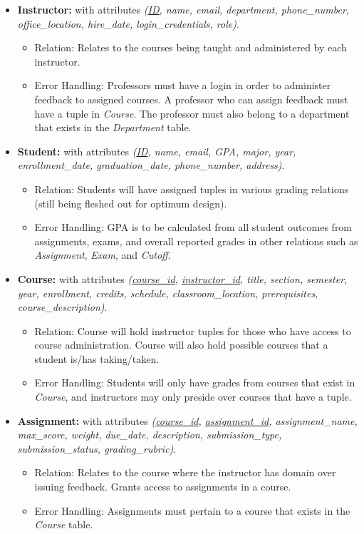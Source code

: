 \documentclass[12pt]{article}
\begin{document}
\begin{itemize}
    \item \textbf{Instructor:} with attributes \textit{(\underline{ID}, name, email, department, phone\_number, office\_location, hire\_date, login\_credentials, role)}.
    \begin{itemize}
        \item Relation: Relates to the courses being taught and administered by each instructor.
        \item Error Handling: Professors must have a login in order to administer feedback to assigned courses. A professor who can assign feedback must have a tuple in \textit{Course}. The professor must also belong to a department that exists in the \textit{Department} table.
    \end{itemize}

    \item \textbf{Student:} with attributes \textit{(\underline{ID}, name, email, GPA, major, year, enrollment\_date, graduation\_date, phone\_number, address)}.
    \begin{itemize}
        \item Relation: Students will have assigned tuples in various grading relations (still being fleshed out for optimum design).
        \item Error Handling: GPA is to be calculated from all student outcomes from assignments, exams, and overall reported grades in other relations such as \textit{Assignment}, \textit{Exam}, and \textit{Cutoff}.
    \end{itemize}

    \item \textbf{Course:} with attributes \textit{(\underline{course\_id}, \underline{instructor\_id}, title, section, semester, year, enrollment, credits, schedule, classroom\_location, prerequisites, course\_description)}.
    \begin{itemize}
        \item Relation: Course will hold instructor tuples for those who have access to course administration. Course will also hold possible courses that a student is/has taking/taken.
        \item Error Handling: Students will only have grades from courses that exist in \textit{Course}, and instructors may only preside over courses that have a tuple.
    \end{itemize}

    \item \textbf{Assignment:} with attributes \textit{(\underline{course\_id}, \underline{assignment\_id}, assignment\_name, max\_score, weight, due\_date, description, submission\_type, submission\_status, grading\_rubric)}.
    \begin{itemize}
        \item Relation: Relates to the course where the instructor has domain over issuing feedback. Grants access to assignments in a course.
        \item Error Handling: Assignments must pertain to a course that exists in the \textit{Course} table.
    \end{itemize}


\end{itemize}
\end{document}
